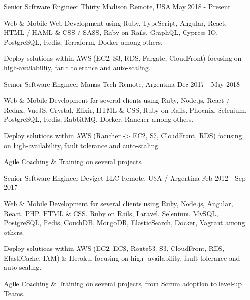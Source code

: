 
\begin{cventries}

  \cventry
    {Senior Software Engineer}
    {Thirty Madison}
    {Remote, USA}
    {May 2018 - Present}
    {
      \begin{cvitems}
        \item {Web \& Mobile Web Development using Ruby, TypeScript, Angular, React, HTML / HAML \& CSS / SASS, Ruby on Rails, GraphQL, Cypress IO, PostgreSQL, Redis, Terraform, Docker among others.}
        \item {Deploy solutions within AWS (EC2, S3, RDS, Fargate, CloudFront) focusing on high-availability, fault tolerance and auto-scaling.}
      \end{cvitems}
    }

  \cventry
    {Senior Software Engineer}
    {Manas Tech}
    {Remote, Argentina}
    {Dec 2017 - May 2018 }
    {
      \begin{cvitems}
        \item {Web \& Mobile Development for several clients using Ruby, Node.js, React / Redux, VueJS, Crystal, Elixir, HTML \& CSS, Ruby on Rails, Phoenix, Selenium, PostgreSQL, Redis, RabbitMQ, Docker, Rancher among others.}
        \item {Deploy solutions within AWS (Rancher -> EC2, S3, CloudFront, RDS) focusing on high-availability, fault tolerance and auto-scaling.}
        \item {Agile Coaching \& Training on several projects.}
      \end{cvitems}
    }

  \cventry
    {Senior Software Engineer}
    {Deviget LLC}
    {Remote, USA / Argentina}
    {Feb 2012 - Sep 2017}
    {
      \begin{cvitems}
        \item {Web \& Mobile Development for several clients using Ruby, Node.js, Angular, React, PHP, HTML \& CSS, Ruby on Rails, Laravel, Selenium, MySQL, PostgreSQL, Redis, CouchDB, MongoDB, ElasticSearch, Docker, Vagrant among others.}
        \item {Deploy solutions within AWS (EC2, ECS, Route53, S3, CloudFront, RDS, ElastiCache, IAM) \& Heroku, focusing on high- availability, fault tolerance and auto-scaling.}
        \item {Agile Coaching \& Training on several projects, from Scrum adoption to level-up Teams.}
      \end{cvitems}
    }


\end{cventries}
